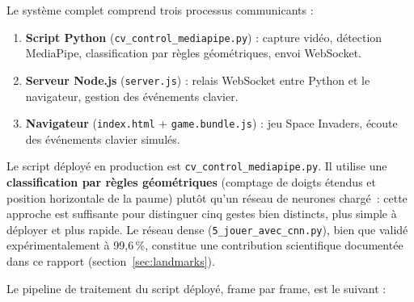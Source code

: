 \documentclass[12pt, a4paper]{article}
\newcommand{\code}[1]{\texttt{\small #1}}
\begin{document}
Le système complet comprend trois processus communicants :

\begin{enumerate}
  \item \textbf{Script Python} (\code{cv\_control\_mediapipe.py}) : capture vidéo,
        détection MediaPipe, classification par règles géométriques, envoi WebSocket.
  \item \textbf{Serveur Node.js} (\code{server.js}) : relais WebSocket entre Python
        et le navigateur, gestion des événements clavier.
  \item \textbf{Navigateur} (\code{index.html} + \code{game.bundle.js}) : jeu
        Space Invaders, écoute des événements clavier simulés.
\end{enumerate}

Le script déployé en production est \code{cv\_control\_mediapipe.py}. Il utilise
une \textbf{classification par règles géométriques} (comptage de doigts étendus
et position horizontale de la paume) plutôt qu'un réseau de neurones chargé~:
cette approche est suffisante pour distinguer cinq gestes bien distincts, plus
simple à déployer et plus rapide. Le réseau dense (\code{5\_jouer\_avec\_cnn.py}),
bien que validé expérimentalement à 99,6\,\%, constitue une contribution
scientifique documentée dans ce rapport (section~\ref{sec:landmarks}).

Le pipeline de traitement du script déployé, frame par frame, est le suivant :

\begin{center}
\end{center}
\end{document}
